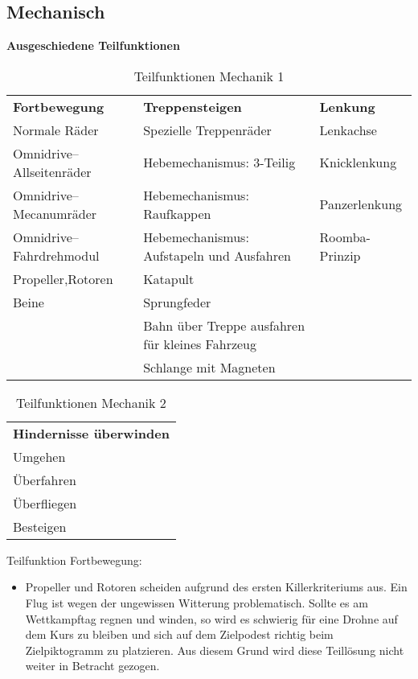 \subsection{Mechanisch}

\textbf{Ausgeschiedene Teilfunktionen}

\begin{center}
\begin{table}[h!]
    \begin{tabular}{l|l|l}
        \textbf{Fortbewegung} & \textbf{Treppensteigen} & \textbf{Lenkung} \\
        Normale Räder & Spezielle Treppenräder & Lenkachse \\
        Omnidrive–Allseitenräder & Hebemechanismus: 3-Teilig & Knicklenkung \\ 
        Omnidrive–Mecanumräder & Hebemechanismus: Raufkappen & Panzerlenkung \\
        Omnidrive–Fahrdrehmodul & Hebemechanismus: Aufstapeln und Ausfahren & Roomba-Prinzip \\
        \cellcolor{red}Propeller,Rotoren & \cellcolor{red}Katapult & \\
        Beine & Sprungfeder & \\
         & \cellcolor{red}Bahn über Treppe ausfahren für kleines Fahrzeug & \\ 
         & \cellcolor{red}Schlange mit Magneten & \\
    \end{tabular}
    \caption{Teilfunktionen Mechanik 1}
\end{table}
\end{center}

\begin{center}
\begin{table}[h!]
    \begin{tabular}{l}
        \textbf{Hindernisse überwinden}\\
        Umgehen\\
        \cellcolor{red}Überfahren\\
        \cellcolor{red}Überfliegen\\
        \cellcolor{red}Besteigen\\
    \end{tabular}
    \caption{Teilfunktionen Mechanik 2}
\end{table}
\end{center}

Teilfunktion Fortbewegung:
\begin{itemize}
    \item Propeller und Rotoren scheiden aufgrund des ersten Killerkriteriums aus. Ein Flug ist wegen der ungewissen Witterung problematisch. Sollte es am Wettkampftag regnen und winden, so wird es schwierig für eine Drohne auf dem Kurs zu bleiben und sich auf dem Zielpodest richtig beim Zielpiktogramm zu platzieren. Aus diesem Grund wird diese Teillösung nicht weiter in Betracht gezogen.
 \end{itemize}

